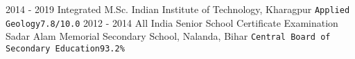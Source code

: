 \documentclass[8pt]{developercv} %
\begin{document}
\vspace{0.1cm}
\begin{entrylist}
	\entry
		{2014 - 2019}
		{Integrated M.Sc.}
		{Indian Institute of Technology, Kharagpur}
		{\texttt{Applied Geology}\hfill\texttt{7.8/10.0}}
	\entry
		{2012 - 2014}
		{All India Senior School Certificate Examination}
		{Sadar Alam Memorial Secondary School, Nalanda, Bihar}
		{\texttt{Central Board of Secondary Education}\hfill\texttt{93.2\%}}
\end{entrylist}
\end{document}
